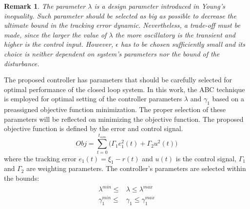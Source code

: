 \documentclass{article} %
\newtheorem{remark}{Remark}
\begin{document}
\begin{remark}
The parameter $\lambda$ is a design parameter introduced in Young's inequality. Such parameter should be selected as big as possible to decrease the ultimate bound in the tracking error dynamic. Nevertheless, a trade-off must be made, since the larger the value of $\lambda$ the more oscillatory is the transient and higher is the control input. However, $\epsilon$ has to be chosen sufficiently small and its choice is neither dependent on system's parameters nor the bound of the disturbance.
\end{remark}
The proposed controller has parameters that should be carefully selected for optimal performance of the closed loop system. In this work, the ABC technique is employed for optimal setting of the controller parameters $\lambda$ and $\gamma_1$ based on a preassigned objective function minimization. The proper selection of these parameters will be reflected on minimizing the objective function. The proposed objective function is defined by the error and control signal.
\begin{equation}
  Obj = \sum\limits_{t=0}^{t_{sim}}\big(\Gamma_1 e_1^2(t)+\Gamma_2 u^2(t)\big)
\end{equation}
where the tracking error $e_1(t)=\xi_1-r(t)$ and $u(t)$ is the control signal, $\Gamma_1$ and $\Gamma_2$ are weighting parameters. The controller's parameters are selected within the bounds:
\begin{equation*} \label{MyEq88888}
  \begin{aligned}
   \lambda^{min}  \leq & \lambda \leq \lambda^{max} \\
   \gamma_1^{min} \leq & \gamma_1 \leq \gamma_1^{max} \\
  \end{aligned}
\end{equation*}
\end{document}
